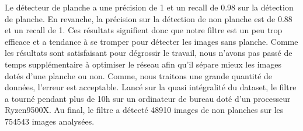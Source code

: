 Le détecteur de planche a une précision de 1 et un recall de 0.98 sur la détection de planche. En revanche, la précision sur la détection de non planche est de 0.88 et un recall de 1. Ces résultats signifient donc que notre filtre est un peu trop efficace et a tendance à se tromper pour détecter les images sans planche. Comme les résultats sont satisfaisant pour dégrossir le travail, nous n'avons pas passé de temps supplémentaire à optimiser le réseau afin qu'il sépare mieux les images dotés d'une planche ou non. Comme, nous traitons une grande quantité de données, l'erreur est acceptable. Lancé sur la quasi intégralité du dataset, le filtre a tourné pendant plus de 10h sur un ordinateur de bureau doté d'un processeur Ryzen9500X. Au final, le filtre a détecté 48910 images de non planches sur les 754543 images analysées.